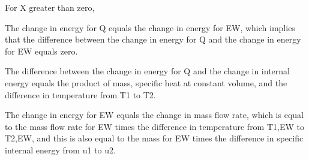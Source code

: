 For X greater than zero,

The change in energy for Q equals the change in energy for EW, which implies that the difference between the change in energy for Q and the change in energy for EW equals zero.

The difference between the change in energy for Q and the change in internal energy equals the product of mass, specific heat at constant volume, and the difference in temperature from T1 to T2.

The change in energy for EW equals the change in mass flow rate, which is equal to the mass flow rate for EW times the difference in temperature from T1,EW to T2,EW, and this is also equal to the mass for EW times the difference in specific internal energy from u1 to u2.
